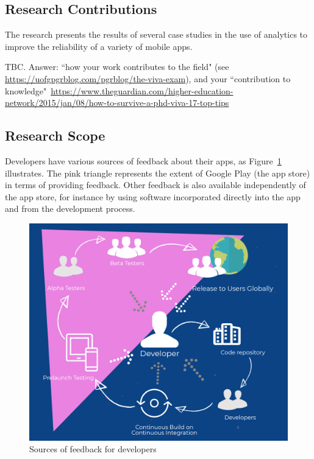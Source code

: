 \subsection{Research Contributions}
The research presents the results of several case studies in the use of analytics to improve the reliability of a variety of mobile apps.

TBC. Answer: ``how your work contributes to the field" (see \url{https://uofgpgrblog.com/pgrblog/the-viva-exam}), and your ``contribution to knowledge"~\url{https://www.theguardian.com/higher-education-network/2015/jan/08/how-to-survive-a-phd-viva-17-top-tips}

\subsection{Research Scope}
Developers have various sources of feedback about their apps, as Figure~\ref{fig:sources-of-feedback-for-developers} illustrates. The pink triangle represents the extent of Google Play (the app store) in terms of providing feedback. Other feedback is also available independently of the app store, for instance by using software incorporated directly into the app and from the development process.

\begin{figure}[htbp!]
    \centering
    \includegraphics[width=13cm]{images/silvias-developer-centric-figure-mobilesoft2020.png}
    \caption{Sources of feedback for developers}
    \label{fig:sources-of-feedback-for-developers}
\end{figure}

